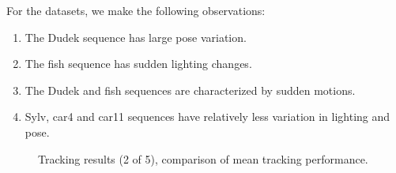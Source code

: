 For the datasets, we make the following observations:

\begin{enumerate}
\item The Dudek sequence has large pose variation.
\item The fish sequence has sudden lighting changes.
\item The Dudek and fish sequences are characterized by sudden motions.
\item Sylv, car4 and car11 sequences have relatively less variation in lighting and pose.
\end{enumerate}

								\begin{figure}[t]
								\centering
								
								\caption{Tracking results (2 of 5), comparison of mean tracking performance.}
								\label{fig:results_final_2_mean}
								\end{figure}


